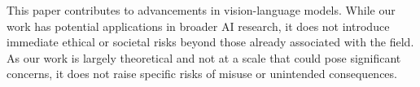 This paper contributes to advancements in vision-language models. While our work has potential applications in broader AI research, it does not introduce immediate ethical or societal risks beyond those already associated with the field. As our work is largely theoretical and not at a scale that could pose significant concerns, it does not raise specific risks of misuse or unintended consequences.
